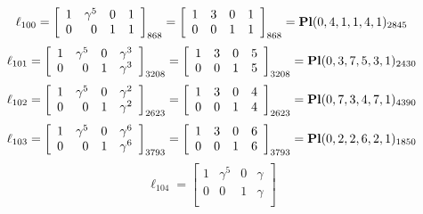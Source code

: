 \documentclass{article}
\begin{document}
{$$
\ell_{100} = 
\left[
\begin{array}{*{4}{r}}
1 & \gamma^{5} & 0 & 1\\
0 & 0 & 1 & 1\\
\end{array}
\right]
_{868}
=
\left[
\begin{array}{*{4}c}
1  & 3  & 0  & 1\\
0  & 0  & 1  & 1\\
\end{array}
\right]_{868}
={\rm\bf Pl}(0,4,1,1,4,1 )_{2845}$$
$$
\ell_{101} = 
\left[
\begin{array}{*{4}{r}}
1 & \gamma^{5} & 0 & \gamma^{3}\\
0 & 0 & 1 & \gamma^{3}\\
\end{array}
\right]
_{3208}
=
\left[
\begin{array}{*{4}c}
1  & 3  & 0  & 5\\
0  & 0  & 1  & 5\\
\end{array}
\right]_{3208}
={\rm\bf Pl}(0,3,7,5,3,1 )_{2430}$$
$$
\ell_{102} = 
\left[
\begin{array}{*{4}{r}}
1 & \gamma^{5} & 0 & \gamma^{2}\\
0 & 0 & 1 & \gamma^{2}\\
\end{array}
\right]
_{2623}
=
\left[
\begin{array}{*{4}c}
1  & 3  & 0  & 4\\
0  & 0  & 1  & 4\\
\end{array}
\right]_{2623}
={\rm\bf Pl}(0,7,3,4,7,1 )_{4390}$$
$$
\ell_{103} = 
\left[
\begin{array}{*{4}{r}}
1 & \gamma^{5} & 0 & \gamma^{6}\\
0 & 0 & 1 & \gamma^{6}\\
\end{array}
\right]
_{3793}
=
\left[
\begin{array}{*{4}c}
1  & 3  & 0  & 6\\
0  & 0  & 1  & 6\\
\end{array}
\right]_{3793}
={\rm\bf Pl}(0,2,2,6,2,1 )_{1850}$$
$$
\ell_{104} = 
\left[
\begin{array}{*{4}{r}}
1 & \gamma^{5} & 0 & \gamma \\
0 & 0 & 1 & \gamma \\
\end{array}
\right]
$$}
\end{document}
